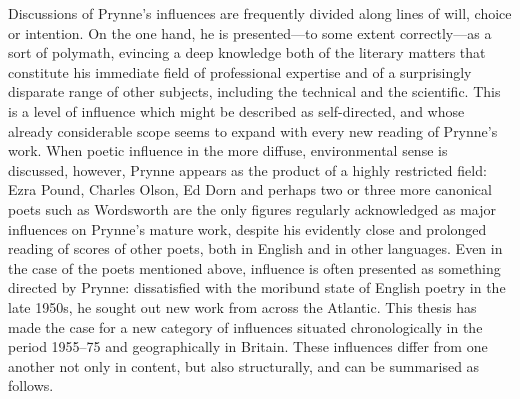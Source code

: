 \documentclass[]{article}
\begin{document}
Discussions of Prynne’s influences are frequently divided along lines of
will, choice or intention. On the one hand, he is presented—to some
extent correctly—as a sort of polymath, evincing a deep knowledge both
of the literary matters that constitute his immediate field of
professional expertise and of a surprisingly disparate range of other
subjects, including the technical and the scientific. This is a level of
influence which might be described as self-directed, and whose already
considerable scope seems to expand with every new reading of Prynne’s
work. When poetic influence in the more diffuse, environmental sense is
discussed, however, Prynne appears as the product of a highly restricted
field: Ezra Pound, Charles Olson, Ed Dorn and perhaps two or three more
canonical poets such as Wordsworth are the only figures regularly
acknowledged as major influences on Prynne’s mature work, despite his
evidently close and prolonged reading of scores of other poets, both in
English and in other languages. Even in the case of the poets mentioned
above, influence is often presented as something directed by Prynne:
dissatisfied with the moribund state of English poetry in the late
1950s, he sought out new work from across the Atlantic. This thesis has
made the case for a new category of influences situated chronologically
in the period 1955–75 and geographically in Britain. These influences
differ from one another not only in content, but also structurally, and
can be summarised as follows.
\end{document}
